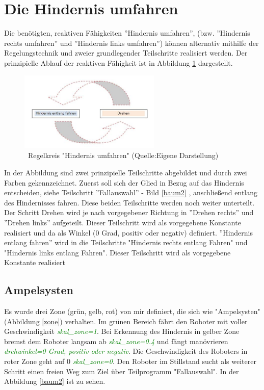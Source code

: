 \newpage
\renewcommand{\autoren}{Valentyn Chepil}
\section{Die Hindernis umfahren}

Die benötigten, reaktiven Fähigkeiten ”Hindernis umfahren”, (bzw. ”Hindernis rechts umfahren” und ”Hindernis links umfahren”) können alternativ mithilfe der Regelungstechnik und zweier grundlegender Teilschritte realisiert werden. Der prinzipielle Ablauf der reaktiven Fähigkeit ist in Abbildung \ref{bild_HUR} dargestellt. 

\begin{figure}[!h]  %
	\centering\includegraphics[width=0.6\textwidth]{images/Bild-HUR.jpg}
	\caption{ \ Regelkreis "Hindernis umfahren" (Quelle:Eigene Darstellung)}
	\label{bild_HUR} %
\end{figure}

In der Abbildung sind zwei prinzipielle Teilschritte abgebildet und durch zwei Farben gekennzeichnet. Zuerst soll sich der Glied in Bezug auf das Hindernis entscheiden, siehe Teilschritt ”Fallauswahl” - Bild \ref{baum2} , anschließend entlang des Hindernisses fahren. Diese beiden Teilschritte werden noch weiter unterteilt. Der Schritt Drehen wird je nach vorgegebener Richtung in ”Drehen rechts” und ”Drehen links” aufgeteilt. Dieser Teilschritt wird als vorgegebene Konstante realisiert und da als Winkel (0 Grad, positiv oder negativ) definiert. ”Hindernis entlang fahren” wird in die Teilschritte "Hindernis rechts entlang Fahren" und "Hindernis links entlang Fahren". Dieser Teilschritt wird als vorgegebene Konstante realisiert

\subsection{Ampelsysten}

Es wurde drei Zone (grün, gelb, rot) von mir definiert, die sich wie "Ampelsysten"  (Abbildung \ref{zone}) verhalten. Im grünen Bereich fährt den Roboter mit voller Geschwindigkeit \textcolor{green}{\textit{skal\_zone=1}}. Bei Erkennung des Hindernis in gelber Zone bremst dem Roboter langsam ab \textcolor{green}{\textit{skal\_zone=0.4}} und fängt manövrieren \textcolor{green}{\textit{drehwinkel=0 Grad, positiv oder negativ}}. Die Geschwindigkeit  des Roboters in roter Zone geht auf 0 \textcolor{green}{\textit{skal\_zone=0}}. Den Roboter im Stillstand sucht als weiterer Schritt einen freien Weg zum Ziel über Teilprogramm "Fallauswahl". In der Abbildung \ref{baum2} ist zu sehen.

